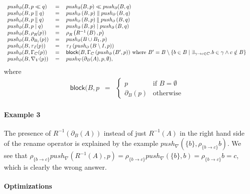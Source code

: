 \documentclass{article}
\providecommand{\leftmerge}{\mathbin{\mathrel{\llfloor}}}
\begin{document}
\[\begin{tabular}{lll}
$push_{\partial }(B,p\ll q)$ & $=$ & $push_{\partial }(B,p)\ll
push_{\partial }(B,q)$ \\ 
$push_{\partial }(B,p\parallel q)$ & $=$ & $push_{\partial }\left(
B,p\right) \parallel push_{\partial }\left( B,q\right) $ \\ 
$push_{\partial }(B,p\leftmerge q)$ & $=$ & $push_{\partial }\left(
B,p\right) \leftmerge push_{\partial }\left( B,q\right) $ \\ 
$push_{\partial }(B,p\mid q)$ & $=$ & $push_{\partial }\left( B,p\right)
\mid push_{\partial }\left( B,q\right) $ \\ 
$push_{\partial }(B,\rho _{R}(p))$ & $=$ & $\rho _{R}\left( R^{-1}\left(
B\right) ,p\right) $ \\ 
$push_{\partial }(B,\partial _{B_{1}}(p))$ & $=$ & $push_{\partial }(B\cup
B_{1},p)$ \\ 
$push_{\partial }(B,\tau _{I}(p))$ & $=$ & $\tau _{I}\left( push_{\partial
}\left( B\setminus I,p\right) \right) $ \\ 
$push_{\partial }(B,\Gamma _{C}(p))$ & $=$ & $\mathsf{block}(B,\Gamma
_{C}\left( push_{\partial }\left( B^{\prime },p\right) \right) $ where $%
B^{\prime }=B\setminus \left\{ b\in B\mid \exists _{\gamma \rightarrow c\in
C}.b\in \gamma \wedge c\notin B\right\} $ \\ 
$push_{\partial }(B,\nabla _{V}(p))$ & $=$ & $push_{\nabla }(\partial
_{B}(A),p,\emptyset ),$%
\end{tabular}%
\]%
where%
\[
\begin{array}{lll}
\mathsf{block}(B,p & = & \left\{ 
\begin{array}{ll}
p & \text{if }B=\emptyset \\ 
\partial _{B}(p) & \text{otherwise}%
\end{array}%
\right.%
\end{array}%
\]

\paragraph{Example 3}

The presence of $R^{-1}(\partial _{B}(A))$ instead of just $R^{-1}(A)$ in
the right hand side of the rename operator is explained by the example $%
push_{\nabla }(\{b\},\rho _{\{b\rightarrow c\}}b)$. We see that $\rho
_{\{b\rightarrow c\}}push_{\nabla }(R^{-1}(A),p)=\rho _{\{b\rightarrow
c\}}push_{\nabla }(\{b\},b)=\rho _{\{b\rightarrow c\}}b=c$, which is clearly
the wrong answer.

\paragraph{Optimizations}
\end{document}
